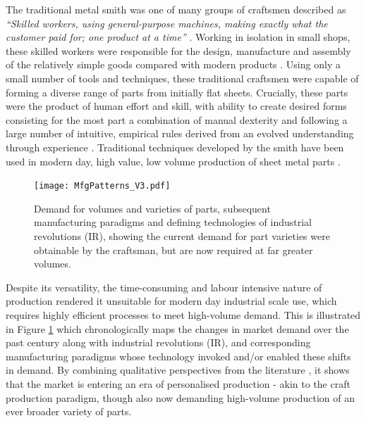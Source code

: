 The traditional metal smith was one of many groups of craftsmen described as \textit{``Skilled workers, using general-purpose machines, making exactly what the customer paid for; one product at a time''} \citep{Koren2010TheRevolution}. Working in isolation in small shops, these skilled workers were responsible for the design, manufacture and assembly of the relatively simple goods compared with modern products \citep{Groover2015AutomationEdition}.  Using only a small number of tools and techniques, these traditional craftsmen were capable of forming a diverse range of parts from initially flat sheets. Crucially, these parts were the product of human effort and skill, with ability to create desired forms consisting for the most part a combination of manual dexterity and following a large number of intuitive, empirical rules derived from an evolved understanding through experience \citep{Hall1961EngineeringRevolution}. Traditional techniques developed by the smith have been used in modern day, high value, low volume production of sheet metal parts \citep{Amos2015Bloodhoundfeathers}.

\begin{figure}[h]
	\centering
	\texttt{[image: MfgPatterns\_V3.pdf]}
	\caption{Demand for volumes and varieties of parts, subsequent manufacturing paradigms and defining technologies of industrial revolutions (IR), showing the current demand for part varieties were obtainable by the craftsman, but are now required at far greater volumes.}
	\label{fig:VarietyVolume}
\end{figure}

Despite its versatility, the time-consuming and labour intensive nature of production rendered it unsuitable for modern day industrial scale use, which requires highly efficient processes to meet high-volume demand. This is illustrated in Figure \ref{fig:VarietyVolume} which chronologically maps the changes in market demand over the past century  along with industrial revolutions (IR), and corresponding manufacturing paradigms whose technology invoked and/or enabled these shifts in demand. By combining qualitative perspectives from the literature \citep{Koren2010TheRevolution,Popkova2019FundamentalRevolutions,Mourtzis2012DecentralizedOutlook,Mourtzis2014TheCustomisation}, it shows that the market is entering an era of personalised production - akin to the craft production paradigm, though also now demanding high-volume production of an ever broader variety of parts.  

